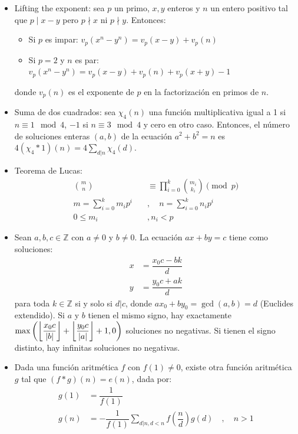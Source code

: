 		\begin{itemize}
			\item Lifting the exponent: sea $p$ un primo, $x,y$ enteros y $n$ un entero positivo tal que $p \mid x-y$ pero $p \nmid x$ ni $p \nmid y$. Entonces:
			\begin{itemize}
				\item Si $p$ es impar: $v_p(x^n-y^n) = v_p(x-y) + v_p(n)$
				\item Si $p=2$ y $n$ es par: $v_p(x^n-y^n) = v_p(x-y) + v_p(n) + v_p(x+y) - 1$
			\end{itemize}
			donde $v_p(n)$ es el exponente de $p$ en la factorización en primos de $n$.
			\item Suma de dos cuadrados: sea $\chi_4(n)$ una función multiplicativa igual a 1 si $n \equiv 1 \mod 4$, $-1$ si $n \equiv 3 \mod 4$ y cero en otro caso. Entonces, el número de soluciones enteras $(a,b)$ de la ecuación $a^2+b^2=n$ es $4(\chi_4 * 1)(n) = 4 \displaystyle \sum_{d | n} \chi_4(d)$.
			\item Teorema de Lucas:
			\begin{align*}
				\binom{m}{n} &\equiv \prod_{i=0}^{k} \binom{m_i}{k_i} \pmod{p} \\
				m = \sum_{i=0}^{k} m_i p^i \quad &, \quad n = \sum_{i=0}^{k} n_i p^i \\
				0 \leq m_i &, n_i < p
			\end{align*}
			
			\item Sean $a,b,c \in \mathbb{Z}$ con $a \neq 0$ y $b \neq 0$. La ecuación $ax+by=c$ tiene como soluciones:
			\begin{align*}
				x &= \dfrac{x_0 c - bk}{d} \\
				y &= \dfrac{y_0 c + ak}{d} 
			\end{align*}
			para toda $k \in \mathbb{Z}$ si y solo si $d | c$, donde $ax_0+by_0=\gcd(a,b)=d$ (Euclides extendido). Si $a$ y $b$ tienen el mismo signo, hay exactamente $\max\left( \left\lfloor\dfrac{x_0 c}{\left|b\right|}\right\rfloor + \left\lfloor\dfrac{y_0 c}{\left|a\right|}\right\rfloor + 1, 0 \right)$ soluciones no negativas. Si tienen el signo distinto, hay infinitas soluciones no negativas.
			
			\item Dada una función aritmética $f$ con $f(1) \neq 0$, existe otra función aritmética $g$ tal que $(f*g)(n)=e(n)$, dada por:
			\begin{align*}
				g(1) &= \dfrac{1}{f(1)} \\
				g(n) &= -\dfrac{1}{f(1)} \sum_{d | n, d<n} f\left(\dfrac{n}{d}\right)g(d) \quad , \quad n > 1
			\end{align*}
			

\end{itemize}
